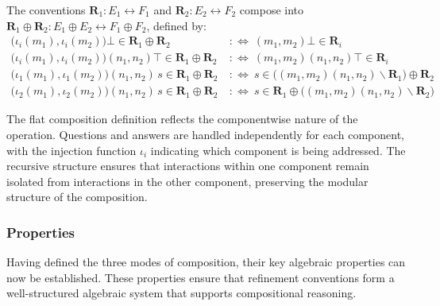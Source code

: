 \begin{definition}
  The conventions
  $\mathbf{R}_1 : E_1 \leftrightarrow F_1$ and
  $\mathbf{R}_2 : E_2 \leftrightarrow F_2$
  compose into
  $\mathbf{R}_1 \oplus \mathbf{R}_2 : E_1 \oplus E_2 \leftrightarrow F_1 \oplus F_2$,
  defined by:
  \begin{align*}
    \bigl(\iota_i(m_1), \iota_i(m_2)\bigr)\bot \in \mathbf{R}_1 \oplus \mathbf{R}_2
    \:&:\Leftrightarrow\:
    (m_1,m_2)\bot \in \mathbf{R}_i
    \\
    \bigl(\iota_i(m_1), \iota_i(m_2)\bigr)(n_1,n_2)\top \in \mathbf{R}_1 \oplus \mathbf{R}_2
    \:&:\Leftrightarrow\:
    (m_1,m_2)(n_1,n_2)\top \in \mathbf{R}_i
    \\
    \bigl(\iota_1(m_1), \iota_1(m_2) \bigr)(n_1,n_2) \, s \in \mathbf{R}_1 \oplus \mathbf{R}_2
    \:&:\Leftrightarrow\:
    s \in \bigl( (m_1,m_2)(n_1,n_2) \backslash \mathbf{R}_1 \bigr) \oplus \mathbf{R}_2
    \\
    \bigl(\iota_2(m_1), \iota_2(m_2) \bigr)(n_1,n_2) \, s \in \mathbf{R}_1 \oplus \mathbf{R}_2
    \:&:\Leftrightarrow\:
    s \in \mathbf{R}_1 \oplus \bigl( (m_1,m_2)(n_1,n_2) \backslash \mathbf{R}_2 \bigr)
  \end{align*}
\end{definition}

The flat composition definition reflects the componentwise nature of the operation.
Questions and answers are handled independently for each component,
with the injection function $\iota_i$ indicating which component
is being addressed.
The recursive structure ensures that
interactions within one component remain isolated
from interactions in the other component,
preserving the modular structure of the composition.

\subsubsection{Properties}

Having defined the three modes of composition,
their key algebraic properties can now be established.
These properties ensure that refinement conventions
form a well-structured algebraic system
that supports compositional reasoning.

